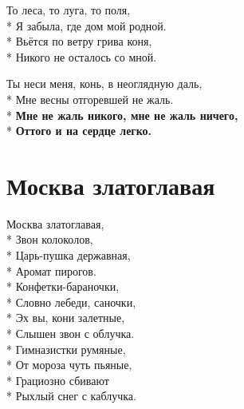 \medskip

\begin{minipage}{\linewidth}
То леса, то луга, то поля,\\*
Я забыла, где дом мой родной.\\*
Вьётся по ветру грива коня,\\*
Никого не осталось со мной.\\
\end{minipage}\par\medskip\nobreak

\medskip

\begin{minipage}{\linewidth}
\hspace*{1.5em}Ты неси меня, конь, в неоглядную даль,\\*
\hspace*{1.5em}Мне весны отгоревшей не жаль.\\*
\hspace*{1.5em}\textbf{Мне не жаль никого, мне не жаль ничего,}\\*
\hspace*{1.5em}\textbf{Оттого и на сердце легко.}\\
\end{minipage}

\vspace{\fill}\newpage

\section{Москва златоглавая}
\label{song:Москва_златоглавая}

\medskip

\begin{minipage}{\linewidth}
Москва златоглавая,\\*
Звон колоколов,\\*
Царь-пушка державная,\\*
Аромат пирогов.\\*
\hspace*{1.5em}Конфетки-бараночки,\\*
\hspace*{1.5em}Словно лебеди, саночки,\\*
\hspace*{1.5em}Эх вы, кони залетные,\\*
\hspace*{1.5em}Слышен звон с облучка.\\*
\hspace*{1.5em}Гимназистки румяные,\\*
\hspace*{1.5em}От мороза чуть пьяные,\\*
\hspace*{1.5em}Грациозно сбивают\\*
\hspace*{1.5em}Рыхлый снег с каблучка.\\
\end{minipage}\par\medskip\nobreak

